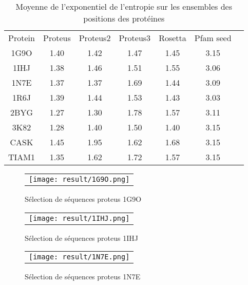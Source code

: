     \begin{table}[!htbp]
      \centering

      \begin{tabular}{ccccccc}

        \toprule
        Protein & Proteus &  Proteus2 &  Proteus3 & Rosetta & Pfam seed \\
        \cmidrule{1-6}
        1G9O  & 1.40 & 1.42 & 1.47 & 1.45 & 3.15  \\
        1IHJ  & 1.38 & 1.46 & 1.51 & 1.55 & 3.06  \\
        1N7E  & 1.37 & 1.37 & 1.69 & 1.44 & 3.09  \\
        1R6J  & 1.39 & 1.44 & 1.53 & 1.43 & 3.03  \\
        2BYG  & 1.27 & 1.30 & 1.78 & 1.57 & 3.11  \\
        3K82  & 1.28 & 1.40 & 1.50 & 1.40 & 3.15  \\
        CASK  & 1.45 & 1.95 & 1.62 & 1.68 & 3.15  \\
        TIAM1 & 1.35 & 1.62 & 1.72 & 1.57 & 3.15  \\
        \bottomrule

      \end{tabular}      
      \caption{Moyenne de l'exponentiel de l'entropie sur les ensembles des positions des protéines}
\label{tab:Entropie_PDZ}      
    \end{table}


    \clearpage

   \begin{figure}[t]
     \centering
     \begin{tabular}{c}
       \texttt{[image: result/1G9O.png]} \\
     \end{tabular}
     \caption{Sélection de séquences proteus 1G9O }
\label{result:1G9O}
   \end{figure}

   \begin{figure}[t]
     \centering
     \begin{tabular}{c}
       \texttt{[image: result/1IHJ.png]} \\
     \end{tabular}
     \caption{Sélection de séquences proteus 1IHJ }
\label{result:1IHJ}
   \end{figure}

    \clearpage
   \begin{figure}[t]
     \centering
     \begin{tabular}{c}
       \texttt{[image: result/1N7E.png]} \\
     \end{tabular}
     \caption{Sélection de séquences proteus 1N7E }
\label{result:1N7E}
   \end{figure}

